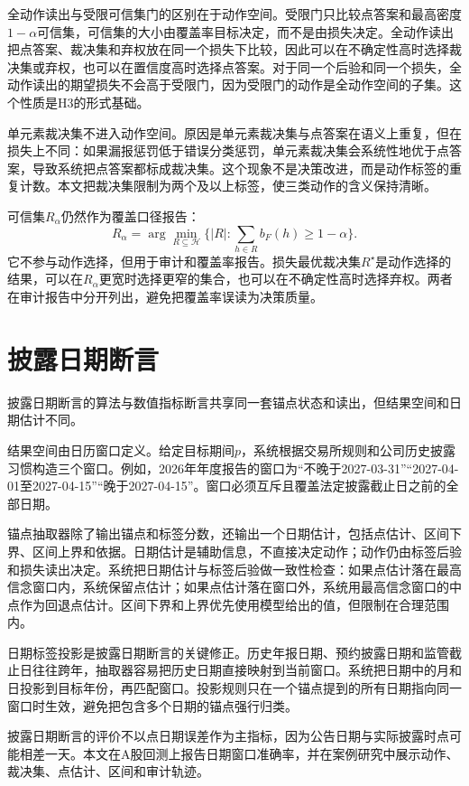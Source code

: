 全动作读出与受限可信集门的区别在于动作空间。受限门只比较点答案和最高密度$1-\alpha$可信集，可信集的大小由覆盖率目标决定，而不是由损失决定。全动作读出把点答案、裁决集和弃权放在同一个损失下比较，因此可以在不确定性高时选择裁决集或弃权，也可以在置信度高时选择点答案。对于同一个后验和同一个损失，全动作读出的期望损失不会高于受限门，因为受限门的动作是全动作空间的子集。这个性质是H3的形式基础。

单元素裁决集不进入动作空间。原因是单元素裁决集与点答案在语义上重复，但在损失上不同：如果漏报惩罚低于错误分类惩罚，单元素裁决集会系统性地优于点答案，导致系统把点答案都标成裁决集。这个现象不是决策改进，而是动作标签的重复计数。本文把裁决集限制为两个及以上标签，使三类动作的含义保持清晰。

可信集$R_\alpha$仍然作为覆盖口径报告：
\begin{equation}
R_\alpha=\arg\min_{R\subseteq\mathcal H}\{|R|:\sum_{h\in R}b_F(h)\ge1-\alpha\}.
\label{eq:credible}
\end{equation}
它不参与动作选择，但用于审计和覆盖率报告。损失最优裁决集$R^\star$是动作选择的结果，可以在$R_\alpha$更宽时选择更窄的集合，也可以在不确定性高时选择弃权。两者在审计报告中分开列出，避免把覆盖率误读为决策质量。

\section{披露日期断言}

披露日期断言的算法与数值指标断言共享同一套锚点状态和读出，但结果空间和日期估计不同。

结果空间由日历窗口定义。给定目标期间$p$，系统根据交易所规则和公司历史披露习惯构造三个窗口。例如，2026年年度报告的窗口为“不晚于2027-03-31”“2027-04-01至2027-04-15”“晚于2027-04-15”。窗口必须互斥且覆盖法定披露截止日之前的全部日期。

锚点抽取器除了输出锚点和标签分数，还输出一个日期估计，包括点估计、区间下界、区间上界和依据。日期估计是辅助信息，不直接决定动作；动作仍由标签后验和损失读出决定。系统把日期估计与标签后验做一致性检查：如果点估计落在最高信念窗口内，系统保留点估计；如果点估计落在窗口外，系统用最高信念窗口的中点作为回退点估计。区间下界和上界优先使用模型给出的值，但限制在合理范围内。

日期标签投影是披露日期断言的关键修正。历史年报日期、预约披露日期和监管截止日往往跨年，抽取器容易把历史日期直接映射到当前窗口。系统把日期中的月和日投影到目标年份，再匹配窗口。投影规则只在一个锚点提到的所有日期指向同一窗口时生效，避免把包含多个日期的锚点强行归类。

披露日期断言的评价不以点日期误差作为主指标，因为公告日期与实际披露时点可能相差一天。本文在A股回测上报告日期窗口准确率，并在案例研究中展示动作、裁决集、点估计、区间和审计轨迹。

